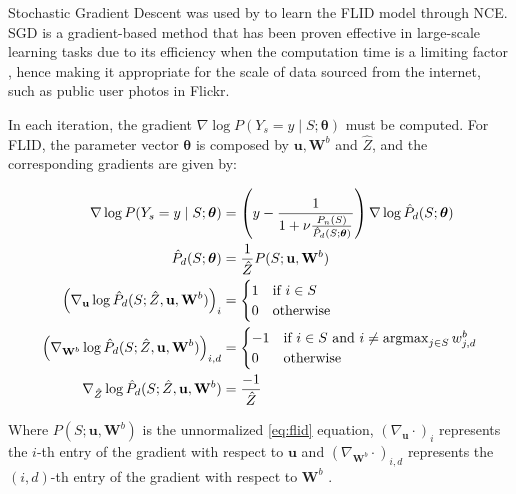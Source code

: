 Stochastic Gradient Descent was used by \citet{tschiatschek16learning} to learn the FLID model through NCE. SGD is a gradient-based method that has been proven effective in large-scale learning tasks due to its efficiency when the computation time is a limiting factor \citep{Bottou2010, Zhang2004}, hence making it appropriate for the scale of data sourced from the internet, such as public user photos in Flickr.

In each iteration, the gradient $\nabla \log{P(Y_{s} = y \mid S;\boldsymbol{\theta})}$ must be computed. For FLID, the parameter vector $\boldsymbol{\theta}$ is composed by $\mathbf{u}, \mathbf{W}^{b}$ and $\hat{Z}$, and the corresponding gradients are given by:

\begin{align}
  \label{eq:gradient-flid-1}
  \nabla \log{P(Y_{s} = y \mid S;\boldsymbol{\theta})} &= \left(y - \frac{1}{1 + \nu \frac{P_{n}(S)}{\hat{P}_{d}(S;\boldsymbol{\theta})}}\right) \nabla \log{\hat{P}_{d}(S;\boldsymbol{\theta})} \\
  \label{eq:gradient-flid-2}
  \hat{P}_{d}(S;\boldsymbol{\theta}) &= \frac{1}{\hat{Z}}P(S; \mathbf{u}, \mathbf{W}^{b}) \\
  \left(\nabla_{\mathbf{u}}\log{\hat{P}_{d}(S; \hat{Z}, \mathbf{u}, \mathbf{W}^{b})}\right)_{i} &= \begin{cases}
    1 &  \text{if}\ i \in S \\
    0 & \text{otherwise}
  \end{cases} \\
  \label{eq:gradient-flid-3}
  \left(\nabla_{\mathbf{W}^{b}}\log{\hat{P}_{d}(S; \hat{Z}, \mathbf{u}, \mathbf{W}^{b})}\right)_{i,d} &= \begin{cases}
    -1 & \text{if}\ i \in S\ \text{and}\ i \neq \operatorname*{argmax}_{j \in S}{w^{b}_{j,d}} \\
    0 & \text{otherwise}
  \end{cases} \\
  \label{eq:gradient-flid-4}
  \nabla_{\hat{Z}}\log{\hat{P}_{d}(S; \hat{Z}, \mathbf{u}, \mathbf{W}^{b})}&= \frac{-1}{\hat{Z}}
\end{align}

Where $P(S;\mathbf{u}, \mathbf{W}^{b})$ is the unnormalized \eqref{eq:flid} equation, $\left(\nabla_{\mathbf{u}}\cdot \right)_{i}$ represents the $i$-th entry of the gradient with respect to $\mathbf{u}$ and $\left(\nabla_{\mathbf{W}^{b}}\cdot\right)_{i,d}$ represents the $(i,d)$-th entry of the gradient with respect to $\mathbf{W}^{b}$ \citep{tschiatschek16learning}.

